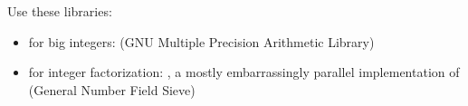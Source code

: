 
\begin{answer}{6}
Use these libraries:
\begin{itemize}
\item for big integers:
   (GNU Multiple Precision Arithmetic Library)
\item for integer factorization:
  , a mostly embarrassingly parallel
  implementation of  (General Number Field Sieve)
\end{itemize}
\end{answer}

